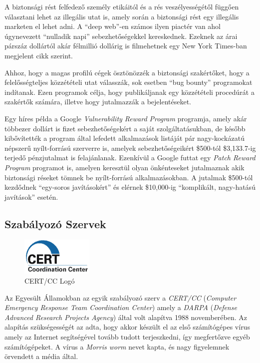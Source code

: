 \documentclass[a4paper,12pt]{article}
\begin{document}
	A biztonsági rést felfedező személy etikáitól és a rés veszélyességétől függően választani lehet az illegális utat is, amely során a biztonsági rést egy illegális marketen el lehet adni. A ``deep web''-en számos ilyen piactér van ahol úgynevezett ``nulladik napi'' sebezhetőségekkel kereskednek. Ezeknek az árai párszáz dollártól akár félmillió dollárig is filmehetnek egy New York Times-ban megjelent cikk szerint\cite{nperlroth13}.
	
	Ahhoz, hogy a magas profilú cégek ösztönözzék a biztonsági szakértőket, hogy a felelősségteljes közzétételi utat válasszák, sok esetben ``bug bounty'' programokat indítanak. Ezen programok célja, hogy publikáljanak egy közzétételi procedúrát a szakértők számára, illetve hogy jutalmazzák a bejelentéseket.
	
	Egy híres példa a Google \textit{Vulnerability Reward Program}\cite{googlevrp15} programja, amely akár többezer dollárt is fizet sebezhetőségekért a saját szolgáltatásukban, de később kibővítették a program által lefedett alkalmazások listáját pár nagy-kockázatú népszerű nyílt-forrású szerverre is, amelyek sebezhetőségeikért \$500-tól \$3,133.7-ig terjedő pénzjutalmat is felajánlanak. Ezenkívül a Google futtat egy \textit{Patch Reward Program} programot is, amelyen keresztül olyan önkénteseket jutalmaznak akik biztonsági réseket tömnek be nyílt-forrású alkalmazásokban. A jutalmak \$500-tól kezdődnek ``egy-soros javításokért'' és elérnek \$10,000-ig ``komplikált, nagy-hatású javítások'' esetén.
	
\subsection{Szabályozó Szervek}
	
	\begin{figure}
		\vspace{-10pt}
		\centering
		\includegraphics[scale=0.75]{cert.png}
		\caption{CERT/CC Logó}
	\end{figure}
	
	Az Egyesült Államokban az egyik szabályozó szerv a \textit{CERT/CC} (\textit{Computer Emergency Response Team Coordination Center}) amely a \textit{DARPA} (\textit{Defense Advanced Research Projects Agency}) által volt alapítva 1988 novemberében. Az alapítás szükségességét az adta, hogy akkor készült el az első számítógépes vírus amely az Internet segítségével tovább tudott terjeszkedni, így megfertőzve egyéb számítógépeket. A vírus a \textit{Morris worm}\cite{cert15} nevet kapta, és nagy figyelemnek örvendett a média által.
	
\end{document}
